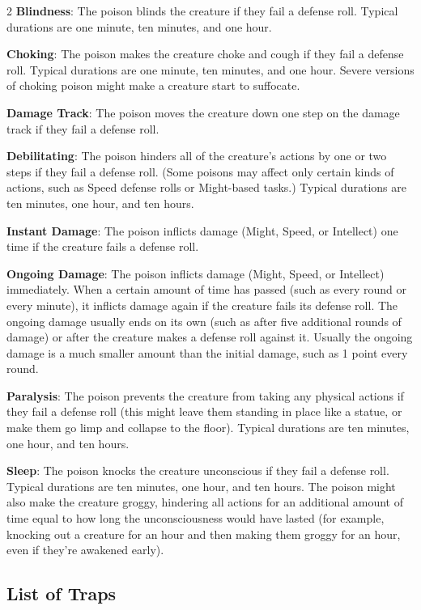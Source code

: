 \begin{multicols}{2}
\textbf{Blindness}: The poison blinds the creature if they fail a defense roll. Typical durations are one minute, ten minutes, and one hour. 

\textbf{Choking}: The poison makes the creature choke and cough if they fail a defense roll. Typical durations are one minute, ten minutes, and one hour. Severe versions of choking poison might make a creature start to suffocate. 

\textbf{Damage Track}: The poison moves the creature down one step on the damage track if they fail a defense roll. 

\textbf{Debilitating}: The poison hinders all of the creature’s actions by one or two steps if they fail a defense roll. (Some poisons may affect only certain kinds of actions, such as Speed defense rolls or Might-based tasks.) Typical durations are ten minutes, one hour, and ten hours. 

\textbf{Instant Damage}: The poison inflicts damage (Might, Speed, or Intellect) one time if the creature fails a defense roll. 

\textbf{Ongoing Damage}: The poison inflicts damage (Might, Speed, or Intellect) immediately. When a certain amount of time has passed (such as every round or every minute), it inflicts damage again if the creature fails its defense roll. The ongoing damage usually ends on its own (such as after five additional rounds of damage) or after the creature makes a defense roll against it. Usually the ongoing damage is a much smaller amount than the initial damage, such as 1 point every round. 

\textbf{Paralysis}: The poison prevents the creature from taking any physical actions if they fail a defense roll (this might leave them standing in place like a statue, or make them go limp and collapse to the floor). Typical durations are ten minutes, one hour, and ten hours. 

\textbf{Sleep}: The poison knocks the creature unconscious if they fail a defense roll. Typical durations are ten minutes, one hour, and ten hours. The poison might also make the creature groggy, hindering all actions for an additional amount of time equal to how long the unconsciousness would have lasted (for example, knocking out a creature for an hour and then making them groggy for an hour, even if they’re awakened early).

\subsection{List of Traps}


\end{multicols}
